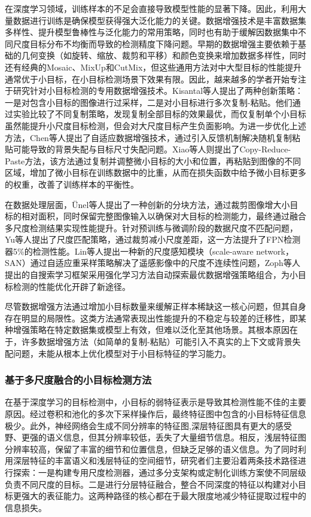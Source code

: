 在深度学习领域，训练样本的不足会直接导致模型性能的显著下降。因此，利用大量数据进行训练是确保模型获得强大泛化能力的关键。数据增强技术是丰富数据集多样性、提升模型鲁棒性与泛化能力的常用策略，同时也有助于缓解因数据集中不同尺度目标分布不均衡而导致的检测精度下降问题。早期的数据增强主要依赖于基础的几何变换（如旋转、缩放、裁剪和平移）和颜色变换来增加数据多样性，同时还有经典的Mosaic\cite{YOLOv4}、MixUp\cite{Zhangmixup}和CutMix\cite{yun2019cutmix}，但这些通用方法对中大型目标的性能提升通常优于小目标，在小目标检测场景下效果有限。因此，越来越多的学者开始专注于研究针对小目标检测的专用数据增强技术。Kisantal等人\cite{kisantal2019augmentation}提出了两种创新策略：一是对包含小目标的图像进行过采样，二是对小目标进行多次复制-粘贴。他们通过实验比较了不同复制策略，发现复制全部目标的效果最优，而仅复制单个小目标虽然能提升小尺度目标检测，但会对大尺度目标产生负面影响。为进一步优化上述方法，Chen等人\cite{ChenRRNet}提出了自适应数据增强技术，通过引入反馈机制解决随机复制粘贴可能导致的背景失配与目标尺寸失配问题。Xiao等人\cite{xiao2023tiny}则提出了Copy-Reduce-Paste方法，该方法通过复制并调整微小目标的大小和位置，再粘贴到图像的不同区域，增加了微小目标在训练数据中的比重，从而在损失函数中给予微小目标更多的权重，改善了训练样本的平衡性。


在数据处理层面，Ünel等人\cite{ozge2019power}提出了一种创新的分块方法，通过裁剪图像增大小目标的相对面积，同时保留完整图像输入以确保对大目标的检测能力，最终通过融合多尺度检测结果实现性能提升。针对预训练与微调阶段的数据尺度不匹配问题，Yu等人\cite{YuScaleMatch}提出了尺度匹配策略，通过裁剪减小尺度差距，这一方法提升了FPN检测器5\%的检测性能。Lin等人\cite{lin2019san}提出一种新的尺度感知模块（scale-aware network，SAN）通过自适应重采样策略解决了遥感影像中的尺度不连续性问题，Zoph等人\cite{zoph2020learning}提出的自搜索学习框架采用强化学习方法自动探索最优数据增强策略组合，为小目标检测的性能优化开辟了新途径。

尽管数据增强方法通过增加小目标数量来缓解正样本稀缺这一核心问题，但其自身存在明显的局限性。这类方法通常表现出性能提升的不稳定与较差的迁移性，即某种增强策略在特定数据集或模型上有效，但难以泛化至其他场景。其根本原因在于，许多数据增强方法（如简单的复制-粘贴）可能引入不真实的上下文或背景失配问题，未能从根本上优化模型对于小目标特征的学习能力。


\subsubsection{基于多尺度融合的小目标检测方法}
在基于深度学习的目标检测中，小目标的弱特征表示是导致其检测性能不佳的主要原因。经过卷积和池化的多次下采样操作后，最终特征图中包含的小目标特征信息极少。此外，神经网络会生成不同分辨率的特征图,深层特征图具有更大的感受野、更强的语义信息，但其分辨率较低，丢失了大量细节信息。相反，浅层特征图分辨率较高，保留了丰富的细节和位置信息，但缺乏足够的语义信息。为了同时利用深层特征的丰富语义和浅层特征的空间细节，研究者们主要沿着两条技术路径进行探索\cite{SJCJ202103001}：一是构建专用尺度检测器，通过多分支架构或定制化训练方案使不同层级负责不同尺度的目标。二是进行分层特征融合，整合不同深度的特征以构建对小目标更强大的表征能力。这两种路径的核心都在于最大限度地减少特征提取过程中的信息损失。

